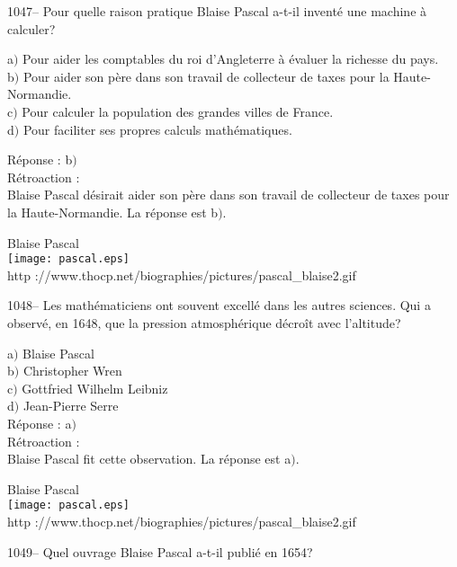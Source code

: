﻿\documentclass[letterpaper, 12pt]{article}
\begin{document}
1047-- Pour quelle raison pratique Blaise Pascal a-t-il invent\'e
une machine \`a calculer?

a$)$ Pour aider les comptables du roi d'Angleterre \`a \'evaluer la richesse
du pays.   \\
b$)$ Pour aider son p\`ere dans son travail de collecteur de taxes pour la
Haute-Normandie.  \\
c$)$ Pour calculer la population des grandes villes de France. \\
d$)$ Pour faciliter ses propres calculs math\'ematiques.

R\'eponse : b$)$\\

R\'etroaction : \\
Blaise Pascal d\'esirait aider son p\`ere dans son travail de
collecteur de taxes pour la Haute-Normandie.
La r\'eponse est b$)$.\\

        \begin{center}
        Blaise Pascal\\
    \texttt{[image: pascal.eps]}\\
        {\footnotesize http
://www.thocp.net/biographies/pictures/pascal\_blaise2.gif}
    \end{center}

1048-- Les math\'ematiciens ont souvent excell\'e dans les autres
sciences. Qui a observ\'e, en 1648, que la pression atmosph\'erique
d\'ecro\^it avec l'altitude?

a$)$ Blaise Pascal \\
b$)$ Christopher Wren   \\
c$)$ Gottfried Wilhelm Leibniz  \\
d$)$ Jean-Pierre Serre \\

R\'eponse : a$)$\\

R\'etroaction : \\
Blaise Pascal fit cette observation.
La r\'eponse est a$)$.\\

        \begin{center}
        Blaise Pascal\\
    \texttt{[image: pascal.eps]}\\
        {\footnotesize http
://www.thocp.net/biographies/pictures/pascal\_blaise2.gif}
    \end{center}

1049-- Quel ouvrage Blaise Pascal a-t-il publi\'e en 1654?
\end{document}
